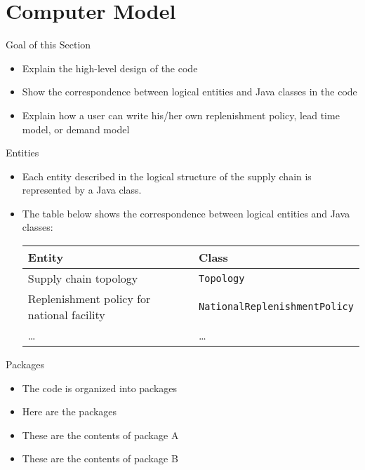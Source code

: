 \documentclass{beamer}
\newcommand{\code}[1]{\texttt{#1}}
\begin{document}
\section{Computer Model}

\begin{frame}{Goal of this Section}
\begin{itemize}
  \item Explain the high-level design of the code
  \item Show the correspondence between logical entities
    and Java classes in the code
  \item Explain how a user can write his/her own
    replenishment policy, lead time model, or demand model
\end{itemize}
\end{frame}

\begin{frame}{Entities}
\begin{itemize}
\item
Each entity described in the logical structure of the supply chain
is represented by a Java class.
\item
The table below shows the correspondence
between logical entities and Java classes:
{ \footnotesize \begin{tabular}{ll}
\toprule
  Entity & Class \\
\midrule
  Supply chain topology
    & \code{Topology} \\
  Replenishment policy for national facility
    & \code{NationalReplenishmentPolicy} \\
  \ldots & \ldots \\
\bottomrule
\end{tabular}}
\end{itemize}
\end{frame}

\begin{frame}{Packages}
\begin{itemize}
\item
The code is organized into packages
\item
Here are the packages
\item
These are the contents of package A
\item
These are the contents of package B
\end{itemize}
\end{frame}
\end{document}

